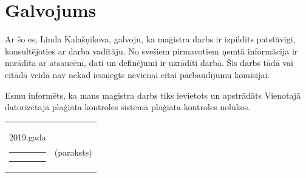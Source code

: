 \documentclass[12pt,paper=A4]{report}
\def\defAutors{Linda Kalašņikova}
\def\defGads{2019}
\begin{document}



\chapter*{Galvojums}
Ar šo es, \defAutors , galvoju, ka maģistra darbs ir izpildīts patstāvīgi,
konsultējoties ar darba vadītāju. No svešiem pirmavotiem ņemtā informācija ir
norādīta ar atsaucēm, dati un definējumi ir uzrādīti darbā. Šis darbs tādā vai citādā veidā
nav nekad iesniegts nevienai citai pārbaudījumu komisijai.

Esmu informēts, ka mans maģistra darbs tiks ievietots un apstrādāts
Vienotajā datorizētajā plaģiāta kontroles sistēmā plāģiāta kontroles nolūkos.

\vspace{1in}
\begin{tabular}{@{}r@{}l@{}}
  \parbox[c]{0.7\textwidth}{\defGads.gada \rule{1cm}{0.2pt}\hspace{3mm}\rule{3cm}{0.2pt}}&
  \parbox[t]{0.2\textwidth}{\centering
  \mbox{}\hrulefill\vspace{-0.8em}\\
  {\scriptsize(paraksts)}\vspace{2em}}
\end{tabular}
\end{document}
